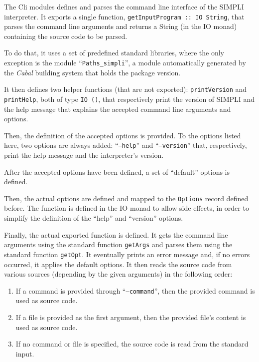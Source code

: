 \documentclass{esposito-documentation}
\begin{document}
The Cli modules defines and parses the command line interface of the SIMPLI
interpreter. It exports a single function,
\lstinline|getInputProgram :: IO String|, that parses the command line
arguments and returns a String (in the IO monad) containing the source code to
be parsed.

To do that, it uses a set of predefined standard libraries, where the only
exception is the module ``\texttt{Paths_simpli}'', a module automatically
generated by the \emph{Cabal} building system \cite{CabalTeam2020} that holds
the package version.



It then defines two helper functions (that are not exported):
\lstinline|printVersion| and \lstinline|printHelp|, both of type
\lstinline|IO ()|, that respectively print the version of SIMPLI and the help
message that explains the accepted command line arguments and options.



Then, the definition of the accepted options is provided. To the options listed
here, two options are always added: ``\texttt{--help}'' and
``\texttt{--version}'' that, respectively, print the help message and the
interpreter's version.



After the accepted options have been defined, a set of ``default'' options is
defined.



Then, the actual options are defined and mapped to the \lstinline|Options|
record defined before. The function is defined in the IO monad to allow side
effects, in order to simplify the definition of the ``help'' and ``version''
options.



Finally, the actual exported function is defined. It gets the command line arguments using the standard function \lstinline|getArgs| and parses them using the standard function \lstinline|getOpt|. It eventually prints an error message and, if no errors occurred, it applies the default options. It then reads the source code from various sources (depending by the given arguments) in the following order:
\begin{enumerate}
	\item If a command is provided through ``\texttt{--command}'', then the
		provided command is used as source code.
	\item If a file is provided as the first argument, then the provided file's
		content is used as source code.
	\item If no command or file is specified, the source code is read from the
		standard input.
\end{enumerate}

\end{document}
